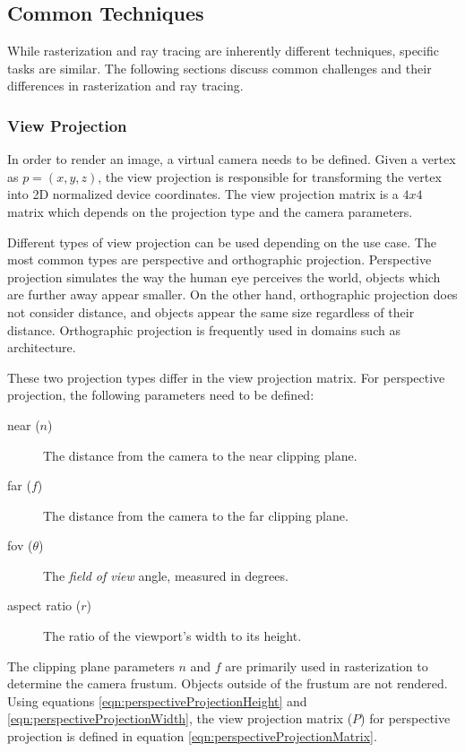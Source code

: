 \subsection{Common Techniques}

While rasterization and ray tracing are inherently different techniques, specific tasks are similar. The following sections discuss common challenges and their differences in rasterization and ray tracing.

\subsubsection{View Projection}
\label{sec:viewProjection}

In order to render an image, a virtual camera needs to be defined. Given a vertex as $p = (x, y, z)$, the view projection is responsible for transforming the vertex into 2D normalized device coordinates. The view projection matrix is a $4x4$ matrix which depends on the projection type and the camera parameters.

Different types of view projection can be used depending on the use case. The most common types are perspective and orthographic projection. Perspective projection simulates the way the human eye perceives the world, objects which are further away appear smaller. On the other hand, orthographic projection does not consider distance, and objects appear the same size regardless of their distance. Orthographic projection is frequently used in domains such as architecture.

These two projection types differ in the view projection matrix. For perspective projection, the following parameters need to be defined:

\begin{description}
  \item[near ($n$)] The distance from the camera to the near clipping plane.
  \item[far ($f$)] The distance from the camera to the far clipping plane.
  \item[fov ($\theta$)] The \textit{field of view} angle, measured in degrees.
  \item[aspect ratio ($r$)] The ratio of the viewport's width to its height.
\end{description}

The clipping plane parameters $n$ and $f$ are primarily used in rasterization to determine the camera frustum. Objects outside of the frustum are not rendered. Using equations \ref{eqn:perspectiveProjectionHeight} and \ref{eqn:perspectiveProjectionWidth}, the view projection matrix ($P$) for perspective projection is defined in equation \ref{eqn:perspectiveProjectionMatrix}.

